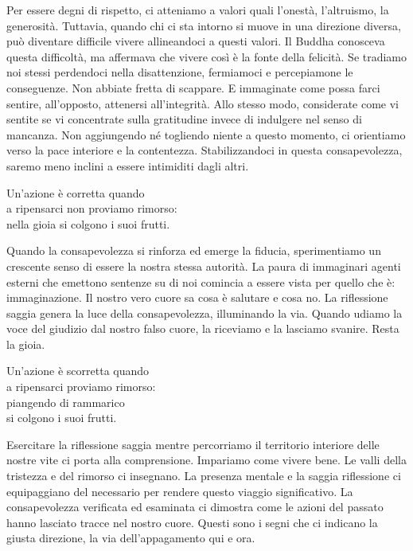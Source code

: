 \begin{dhpRefl}
Per essere degni di rispetto, ci atteniamo a valori quali l'onest\`{a}, l'altruismo, la generosit\`{a}. Tuttavia, quando chi ci sta intorno si muove in una direzione diversa, pu\`{o} diventare difficile vivere allineandoci a questi valori. Il Buddha conosceva questa difficolt\`{a}, ma affermava che vivere così \`{e} la fonte della felicit\`{a}. Se tradiamo noi stessi perdendoci nella disattenzione, fermiamoci e percepiamone le conseguenze. Non abbiate fretta di scappare. E immaginate come possa farci sentire, all'opposto, attenersi all'integrit\`{a}. Allo stesso modo, considerate come vi sentite se vi concentrate sulla gratitudine invece di indulgere nel senso di mancanza. Non aggiungendo n\'{e} togliendo niente a questo momento, ci orientiamo verso la pace interiore e la contentezza. Stabilizzandoci in questa consapevolezza, saremo meno inclini a essere intimiditi dagli altri.
\end{dhpRefl}


\begin{dhpVerse}{68}
\label{dhp-68}
Un'azione \`{e} corretta quando\\
a ripensarci non proviamo rimorso:\\
nella gioia si colgono i suoi frutti.
\end{dhpVerse}

\begin{dhpRefl}
Quando la consapevolezza si rinforza ed emerge la fiducia, sperimentiamo un crescente senso di essere la nostra stessa autorit\`{a}. La paura di immaginari agenti esterni che emettono sentenze su di noi comincia a essere vista per quello che \`{e}: immaginazione. Il nostro vero cuore sa cosa \`{e} salutare e cosa no. La riflessione saggia genera la luce della consapevolezza, illuminando la via. Quando udiamo la voce del giudizio dal nostro falso cuore, la riceviamo e la lasciamo svanire. Resta la gioia.
\end{dhpRefl}


\begin{dhpVerse}{67}
\label{dhp-67}
Un'azione \`{e} scorretta quando\\
a ripensarci proviamo rimorso:\\
piangendo di rammarico\\
si colgono i suoi frutti.
\end{dhpVerse}

\begin{dhpRefl}
Esercitare la riflessione saggia mentre percorriamo il territorio interiore delle nostre vite ci porta alla comprensione. Impariamo come vivere bene. Le valli della tristezza e del rimorso ci insegnano. La presenza mentale e la saggia riflessione ci equipaggiano del necessario per rendere questo viaggio significativo. La consapevolezza verificata ed esaminata ci dimostra come le azioni del passato hanno lasciato tracce nel nostro cuore. Questi sono i segni che ci indicano la giusta direzione, la via dell'appagamento qui e ora.
\end{dhpRefl}

